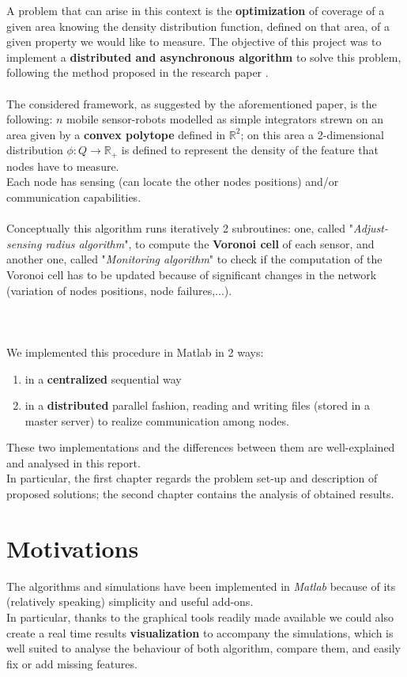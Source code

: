 \documentclass[a4paper,11pt,oneside]{book}
\begin{document}
	A problem that can arise in this context is the \textbf{optimization} of coverage of a given area knowing the density distribution function, defined on that area, of a given property we would like to measure. The objective of this project was to implement a \textbf{distributed and asynchronous algorithm} to solve this problem, following the method proposed in the research paper \cite{K1}.\\\\
	The considered framework, as suggested by the aforementioned paper, is the following: $n$ mobile sensor-robots modelled as simple integrators strewn on an area given by a \textbf{convex polytope} defined in $\mathbb{R}^2$; on this area a 2-dimensional distribution $\phi:Q\rightarrow \mathbb{R}_+$ is defined to represent the density of the feature that nodes have to measure.\\ Each node has sensing (can locate the other nodes positions) and/or communication capabilities.  \\\\
	Conceptually this algorithm runs iteratively 2 subroutines: one, called "\emph{Adjust-sensing radius algorithm}", to compute the \textbf{Voronoi cell} of each sensor, and another one, called "\emph{Monitoring algorithm}" to check if the computation of the Voronoi cell has to be updated because of significant changes in the network (variation of nodes positions, node failures,...).\\\\\\\\ %
	We implemented this procedure in Matlab in 2 ways:
	\begin{enumerate}
		\item in a \textbf{centralized }sequential way
		\item in a \textbf{distributed} parallel fashion, reading and writing files (stored in a master server) to realize communication among nodes.
	\end{enumerate}
	These two implementations and the differences between them are well-explained and analysed in this report.\\
	In particular, the first chapter regards the problem set-up and description of proposed solutions; the second chapter contains the analysis of obtained results.\\
	
	
	\section*{Motivations}
	The algorithms and simulations have been implemented in \emph{Matlab} because of its (relatively speaking) simplicity and useful add-ons.\\
	In particular, thanks to the graphical tools readily made available we could also create a real time results \textbf{visualization} to accompany the simulations, which is well suited to analyse the behaviour of both algorithm, compare them, and easily fix or add missing features.
	
\end{document}
